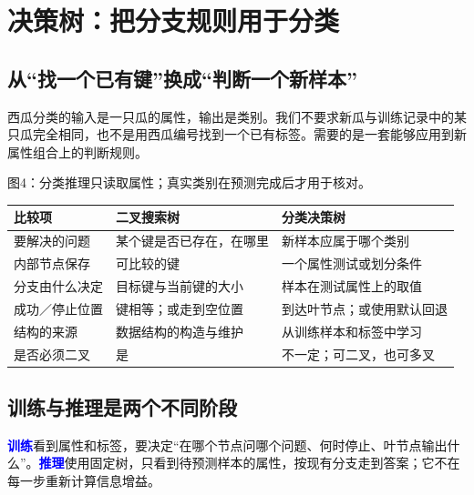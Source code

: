 \documentclass[UTF8,a4paper,11pt,fontset=fandol]{ctexart}
\numberwithin{equation}{subsection}
\newcommand{\term}[1]{\textcolor{Blue}{\textbf{#1}}}
\begin{document}
\clearpage
\section{决策树：把分支规则用于分类}
\subsection{从“找一个已有键”换成“判断一个新样本”}
西瓜分类的输入是一只瓜的属性，输出是类别。我们不要求新瓜与训练记录中的某只瓜完全相同，也不是用西瓜编号找到一个已有标签。需要的是一套能够应用到新属性组合上的判断规则。

\begin{center}

{\small 图4：分类推理只读取属性；真实类别在预测完成后才用于核对。}
\end{center}

\par\noindent\begin{tabularx}{\textwidth}{L{2.6cm}Y Y}
\toprule
比较项 & 二叉搜索树 & 分类决策树\\
\midrule
要解决的问题 & 某个键是否已存在，在哪里 & 新样本应属于哪个类别\\
内部节点保存 & 可比较的键 & 一个属性测试或划分条件\\
分支由什么决定 & 目标键与当前键的大小 & 样本在测试属性上的取值\\
成功／停止位置 & 键相等；或走到空位置 & 到达叶节点；或使用默认回退\\
结构的来源 & 数据结构的构造与维护 & 从训练样本和标签中学习\\
是否必须二叉 & 是 & 不一定；可二叉，也可多叉\\
\bottomrule
\end{tabularx}\par

\subsection{训练与推理是两个不同阶段}
\term{训练}看到属性和标签，要决定“在哪个节点问哪个问题、何时停止、叶节点输出什么”。\term{推理}使用固定树，只看到待预测样本的属性，按现有分支走到答案；它不在每一步重新计算信息增益。
\end{document}
